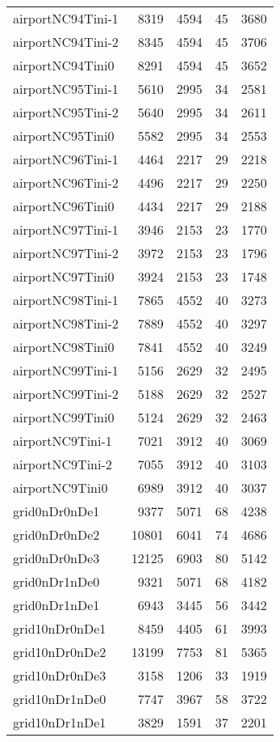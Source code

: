 \begin{longtable}{lrrrr}
airportNC94Tini-1 & 8319 & 4594 & 45 & 3680 \\
airportNC94Tini-2 & 8345 & 4594 & 45 & 3706 \\
airportNC94Tini0 & 8291 & 4594 & 45 & 3652 \\
airportNC95Tini-1 & 5610 & 2995 & 34 & 2581 \\
airportNC95Tini-2 & 5640 & 2995 & 34 & 2611 \\
airportNC95Tini0 & 5582 & 2995 & 34 & 2553 \\
airportNC96Tini-1 & 4464 & 2217 & 29 & 2218 \\
airportNC96Tini-2 & 4496 & 2217 & 29 & 2250 \\
airportNC96Tini0 & 4434 & 2217 & 29 & 2188 \\
airportNC97Tini-1 & 3946 & 2153 & 23 & 1770 \\
airportNC97Tini-2 & 3972 & 2153 & 23 & 1796 \\
airportNC97Tini0 & 3924 & 2153 & 23 & 1748 \\
airportNC98Tini-1 & 7865 & 4552 & 40 & 3273 \\
airportNC98Tini-2 & 7889 & 4552 & 40 & 3297 \\
airportNC98Tini0 & 7841 & 4552 & 40 & 3249 \\
airportNC99Tini-1 & 5156 & 2629 & 32 & 2495 \\
airportNC99Tini-2 & 5188 & 2629 & 32 & 2527 \\
airportNC99Tini0 & 5124 & 2629 & 32 & 2463 \\
airportNC9Tini-1 & 7021 & 3912 & 40 & 3069 \\
airportNC9Tini-2 & 7055 & 3912 & 40 & 3103 \\
airportNC9Tini0 & 6989 & 3912 & 40 & 3037 \\
grid0nDr0nDe1 & 9377 & 5071 & 68 & 4238 \\
grid0nDr0nDe2 & 10801 & 6041 & 74 & 4686 \\
grid0nDr0nDe3 & 12125 & 6903 & 80 & 5142 \\
grid0nDr1nDe0 & 9321 & 5071 & 68 & 4182 \\
grid0nDr1nDe1 & 6943 & 3445 & 56 & 3442 \\
grid10nDr0nDe1 & 8459 & 4405 & 61 & 3993 \\
grid10nDr0nDe2 & 13199 & 7753 & 81 & 5365 \\
grid10nDr0nDe3 & 3158 & 1206 & 33 & 1919 \\
grid10nDr1nDe0 & 7747 & 3967 & 58 & 3722 \\
grid10nDr1nDe1 & 3829 & 1591 & 37 & 2201 \\

\end{longtable}
